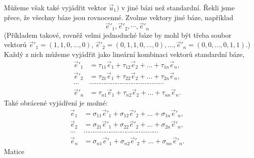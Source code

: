       Můžeme však také vyjádřit vektor \(\vec{u}_1)\) v jiné bázi než standardní. Řekli jsme přece,
      že všechny báze jsou rovnocenné. Zvolme vektory jiné báze, například
      \begin{equation*}
        \vec{e}'_1, \vec{e}'_2, \cdots, \vec{e}'_n
      \end{equation*}
      (Příkladem takové, rovněž velmi jednoduché báze by mohl být třeba soubor vektorů \(\vec{e}'_1
      = (1, 1, 0,\ldots, 0)\), \(\vec{e}'_2 = (0, 1, 1, 0, \ldots, 0), \ldots, \vec{e}'_n = (0, 0,
      ..., 0, 1, 1)\).) Každý z nich můžeme vyjádřit jako lineární kombinaci vektorů standardní
      báze,
      \begin{align}\label{mai:eq081}
        \vec{e}'_1&=\tau_{11}\vec{e}_1+\tau_{12}\vec{e}_2+\ldots+\tau_{1n}\vec{e}_n, \nonumber \\
        \vec{e}'_2&=\tau_{21}\vec{e}_1+\tau_{22}\vec{e}_2+\ldots+\tau_{2n}\vec{e}_n, \nonumber \\
        \cdots&\cdots\cdots\cdots\cdots\cdots\cdots\cdots\cdots\cdots\cdots\cdots\cdots\cdots\cdots\\
        \vec{e}'_n&=\tau_{n1}\vec{e}_1+\tau_{n2}\vec{e}_2+\ldots+\tau_{nn}\vec{e}_n. \nonumber      
      \end{align}
      Také obrácené vyjádření je možné:
      \begin{align}\label{mai:eq082}
        \vec{e}_1&=\sigma_{11}\vec{e}'_1+\sigma_{12}\vec{e}'_2+\ldots+\sigma_{1n}\vec{e}'_n, \nonumber \\
        \vec{e}_2&=\sigma_{21}\vec{e}'_1+\sigma_{22}\vec{e}'_2+\ldots+\sigma_{2n}\vec{e}'_n, \nonumber \\
        \cdots&\cdots\cdots\cdots\cdots\cdots\cdots\cdots\cdots\cdots\cdots\cdots\cdots\cdots\cdots\\
        \vec{e}_n&=\sigma_{n1}\vec{e}'_1+\sigma_{n2}\vec{e}'_2+\ldots+\sigma_{nn}\vec{e}'_n. \nonumber      
      \end{align}  
      Matice
